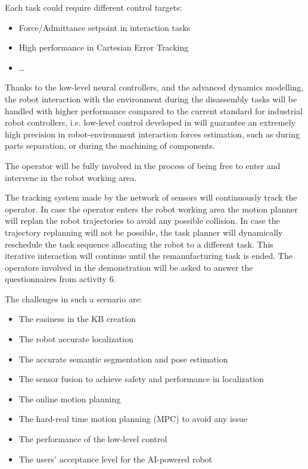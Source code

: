\begin{longtable}[]
{\begin{minipage}[t]{\linewidth}
Each task could require different control targets:

\begin{itemize}
\item
  Force/Admittance setpoint in interaction tasks
\item
  High performance in Cartesian Error Tracking
\item
  \ldots{}
\end{itemize}

Thanks to the low-level neural controllers, and the advanced dynamics
modelling, the robot interaction with the environment during the
disassembly tasks will be handled with higher performance compared to
the current standard for industrial robot controllers, i.e. low-level
control developed in  will guarantee an extremely high
precision in robot-environment interaction forces estimation, such as
during parts separation, or during the machining of components.

The operator will be fully involved in the process of being free to
enter and intervene in the robot working area.

The tracking system made by the network of sensors will continuously
track the operator. In case the operator enters the robot working area
the motion planner will replan the robot trajectories to avoid any
possible collision. In case the trajectory replanning will not be
possible, the task planner will dynamically reschedule the task sequence
allocating the robot to a different task. This iterative interaction
will continue until the remanufacturing task is ended. The operators
involved in the demonstration will be asked to answer the questionnaires
from activity 6.

The challenges in such a scenario are:

\begin{itemize}
\item
  The easiness in the KB creation
\item
  The robot accurate localization
\item
  The accurate semantic segmentation and pose estimation
\item
  The sensor fusion to achieve safety and performance in localization
\item
  The online motion planning
\item
  The hard-real time motion planning (MPC) to avoid any issue
\item
  The performance of the low-level control
\item
  The users' acceptance level for the AI-powered robot
\end{itemize}


\end{minipage}}
\end{longtable}

